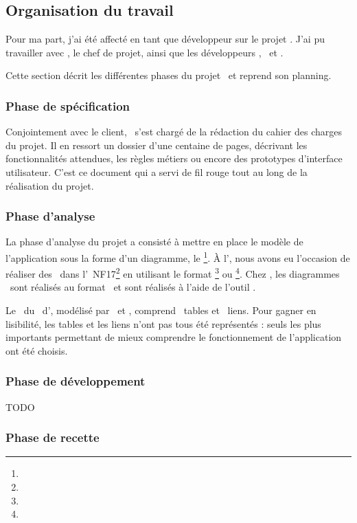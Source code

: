\subsection{Organisation du travail}
\label{section:eyrolles_organisation}

Pour ma part, j'ai été affecté en tant que développeur sur le projet \aey. J'ai pu travailler avec \acohen, le chef de projet, ainsi que les développeurs \ahamon, \aweistroff\ et \abachelet. 

Cette section décrit les différentes phases du projet \aey\ et reprend son planning.


\subsubsection{Phase de spécification}

Conjointement avec le client, \acohen\ s'est chargé de la rédaction du cahier des charges du projet. Il en ressort un dossier d'une centaine de pages, décrivant les fonctionnalités attendues, les règles métiers ou encore des prototypes d'interface utilisateur. C'est ce document qui a servi de fil rouge tout au long de la réalisation du projet.


\subsubsection{Phase d'analyse}

La phase d'analyse du projet a consisté à mettre en place le modèle de l'application sous la forme d'un diagramme, le \emph{\amcd}\footnote{}. À l'\autc, nous avons eu l'occasion de réaliser des \amcds\ dans l'\auv\ NF17\footnote{} en utilisant le format \auml\footnote{} ou \aea\footnote{}. Chez \asl, les diagrammes \amcds\ sont réalisés au format \aea\ et sont réalisés à l'aide de l'outil \amysqlwb.

Le \amcd\ du \alotdeux\ d'\aey, modélisé par \acohen\ et \ahamon, comprend ~tables et ~liens. Pour gagner en lisibilité, les tables et les liens n'ont pas tous été représentés : seuls les plus importants permettant de mieux comprendre le fonctionnement de l'application ont été choisis.


\subsubsection{Phase de développement}

TODO


\subsubsection{Phase de recette}

